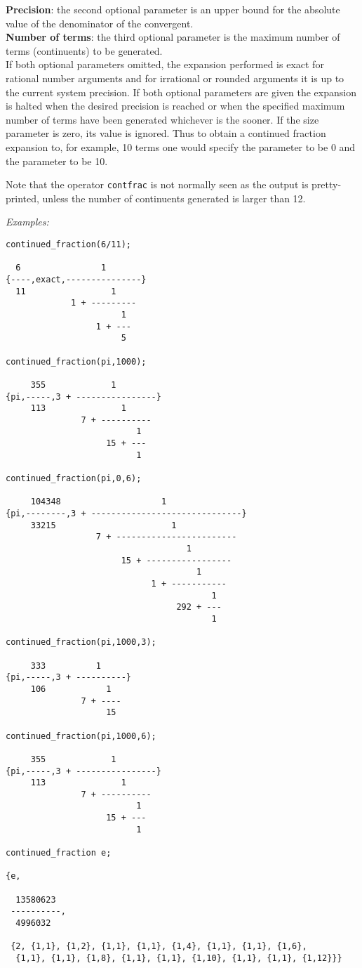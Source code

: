 \textbf{Precision}: the second optional parameter  is an upper
bound for the absolute value of the  denominator of the convergent.\\
\textbf{Number of terms}: the third optional parameter  is
the maximum number of terms (continuents) to be generated.\\
If both optional parameters omitted, the expansion performed is exact for
rational number arguments and for irrational or rounded arguments it is up
to the current system precision.
If both optional parameters are given the expansion is halted when the desired
precision is reached or when the specified maximum number of terms have
been generated whichever is the sooner. If the size parameter is zero,
its value is ignored.  Thus to obtain a continued fraction expansion to,
for example, 10 terms one would specify the  parameter to be 0 and
the  parameter to be 10.

Note that the operator \texttt{contfrac} is not normally seen as the output
is pretty-printed, unless the number of continuents generated is larger
than 12.

\textit{Examples:}
\begin{verbatim}
continued_fraction(6/11);

  6                1
{----,exact,---------------}
  11                 1
             1 + ---------
                       1
                  1 + ---
                       5

continued_fraction(pi,1000);

     355             1
{pi,-----,3 + ----------------}
     113               1
               7 + ----------
                          1
                    15 + ---
                          1

continued_fraction(pi,0,6);

     104348                    1
{pi,--------,3 + ------------------------------}
     33215                       1
                  7 + ------------------------
                                    1
                       15 + -----------------
                                      1
                             1 + -----------
                                         1
                                  292 + ---
                                         1

continued_fraction(pi,1000,3);

     333          1
{pi,-----,3 + ----------}
     106            1
               7 + ----
                    15

continued_fraction(pi,1000,6);

     355             1
{pi,-----,3 + ----------------}
     113               1
               7 + ----------
                          1
                    15 + ---
                          1

continued_fraction e;

{e,

  13580623
 ----------,
  4996032

 {2, {1,1}, {1,2}, {1,1}, {1,1}, {1,4}, {1,1}, {1,1}, {1,6},
  {1,1}, {1,1}, {1,8}, {1,1}, {1,1}, {1,10}, {1,1}, {1,1}, {1,12}}}
\end{verbatim}


